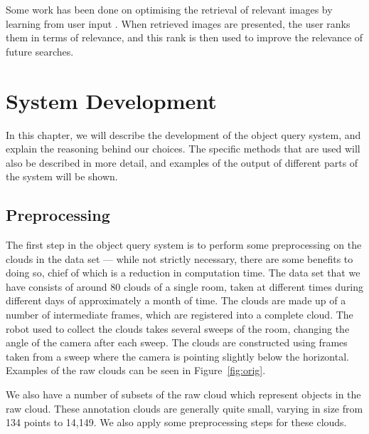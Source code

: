 \documentclass[11pt,a4paper]{kth-mag}
\begin{document}
Some work has been done on optimising the retrieval of relevant images by
learning from user input \cite{rui2000optimizing}. When retrieved images are
presented, the user ranks them in terms of relevance, and this rank is then used
to improve the relevance of future searches.

\chapter{System Development}
\label{chap:devel}
In this chapter, we will describe the development of the object query system,
and explain the reasoning behind our choices. The specific methods that are used
will also be described in more detail, and examples of the output of different
parts of the system will be shown.

\section{Preprocessing}
The first step in the object query system is to perform some preprocessing on
the clouds in the data set --- while not strictly necessary, there are some
benefits to doing so, chief of which is a reduction in computation time. The
data set that we have consists of around 80 clouds of a single room, taken at
different times during different days of approximately a month of time. The
clouds are made up of a number of intermediate frames, which are registered into
a complete cloud. The robot used to collect the clouds takes several sweeps of
the room, changing the angle of the camera after each sweep. The clouds are
constructed using frames taken from a sweep where the camera is pointing
slightly below the horizontal. Examples of the raw clouds can be seen in
Figure~\ref{fig:orig}.

We also have a number of subsets of the raw cloud which represent objects in the
raw cloud. These annotation clouds are generally quite small, varying in size
from 134 points to 14,149. We also apply some preprocessing steps for these
clouds.
\end{document}
